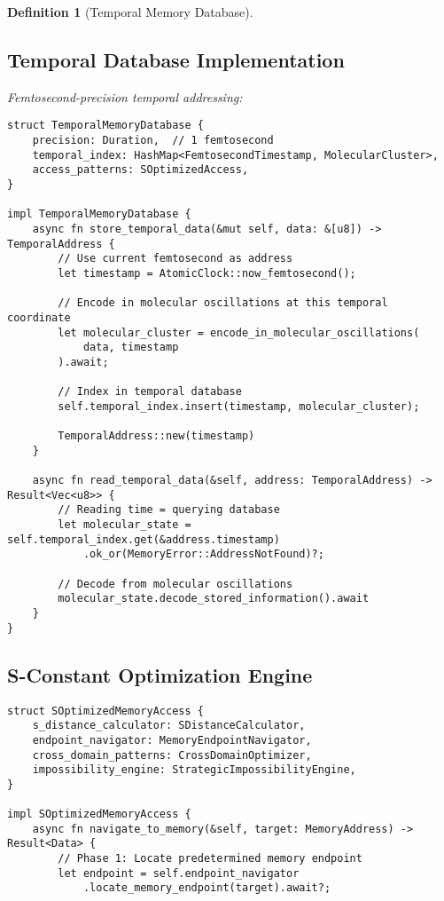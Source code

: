 \documentclass[12pt]{article}
\newtheorem{definition}[theorem]{Definition}
\begin{document}
\begin{definition}[Temporal Memory Database]
\subsection{Temporal Database Implementation}

Femtosecond-precision temporal addressing:

\begin{lstlisting}[caption=Temporal Database Implementation]
struct TemporalMemoryDatabase {
    precision: Duration,  // 1 femtosecond
    temporal_index: HashMap<FemtosecondTimestamp, MolecularCluster>,
    access_patterns: SOptimizedAccess,
}

impl TemporalMemoryDatabase {
    async fn store_temporal_data(&mut self, data: &[u8]) -> TemporalAddress {
        // Use current femtosecond as address
        let timestamp = AtomicClock::now_femtosecond();
        
        // Encode in molecular oscillations at this temporal coordinate
        let molecular_cluster = encode_in_molecular_oscillations(
            data, timestamp
        ).await;
        
        // Index in temporal database
        self.temporal_index.insert(timestamp, molecular_cluster);
        
        TemporalAddress::new(timestamp)
    }
    
    async fn read_temporal_data(&self, address: TemporalAddress) -> Result<Vec<u8>> {
        // Reading time = querying database
        let molecular_state = self.temporal_index.get(&address.timestamp)
            .ok_or(MemoryError::AddressNotFound)?;
            
        // Decode from molecular oscillations
        molecular_state.decode_stored_information().await
    }
}
\end{lstlisting}

\subsection{S-Constant Optimization Engine}

\begin{lstlisting}[caption=S-Constant Memory Optimization]
struct SOptimizedMemoryAccess {
    s_distance_calculator: SDistanceCalculator,
    endpoint_navigator: MemoryEndpointNavigator,
    cross_domain_patterns: CrossDomainOptimizer,
    impossibility_engine: StrategicImpossibilityEngine,
}

impl SOptimizedMemoryAccess {
    async fn navigate_to_memory(&self, target: MemoryAddress) -> Result<Data> {
        // Phase 1: Locate predetermined memory endpoint
        let endpoint = self.endpoint_navigator
            .locate_memory_endpoint(target).await?;
        

\end{lstlisting}
\end{definition}
\end{document}
